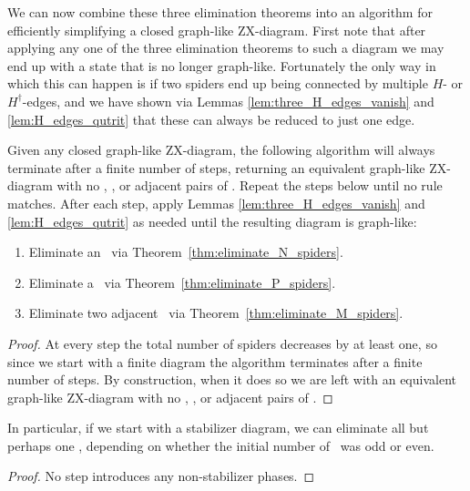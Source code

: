 \documentclass[submission,copyright,creativecommons]{eptcs}
\begin{document}
We can now combine these three elimination theorems into an algorithm for efficiently simplifying a closed graph-like ZX-diagram. First note that after applying any one of the three elimination theorems to such a diagram we may end up with a state that is no longer graph-like. Fortunately the only way in which this can happen is if two spiders end up being connected by multiple $H$- or $H^\dagger$-edges, and we have shown via Lemmas \ref{lem:three_H_edges_vanish} and \ref{lem:H_edges_qutrit} that these can always be reduced to just one edge.

\begin{theorem}\label{thm:simplification_algorithm_works}
	Given any closed graph-like ZX-diagram, the following algorithm will always terminate after a finite number of steps, returning an equivalent graph-like ZX-diagram with no \Nspiders, \Pspiders, or adjacent pairs of \Mspiders. Repeat the steps below until no rule matches. After each step, apply Lemmas \ref{lem:three_H_edges_vanish} and \ref{lem:H_edges_qutrit} as needed until the resulting diagram is graph-like:
	\begin{enumerate}
		\item Eliminate an \Nspider\ via Theorem~\ref{thm:eliminate_N_spiders}.
		\item Eliminate a \Pspider\ via Theorem~\ref{thm:eliminate_P_spiders}.
		\item Eliminate two adjacent \Mspiders\ via Theorem~\ref{thm:eliminate_M_spiders}.
	\end{enumerate}
	\begin{proof}
		At every step the total number of spiders decreases by at least one, so since we start with a finite diagram the algorithm terminates after a finite number of steps. By construction, when it does so we are left with an equivalent graph-like ZX-diagram with no \Nspiders, \Pspiders, or adjacent pairs of \Mspiders.
	\end{proof}
\end{theorem}

\begin{corollary}\label{cor:stabilizer_simplification_algorithm_works}
	In particular, if we start with a stabilizer diagram, we can eliminate all but perhaps one \Mspider, depending on whether the initial number of \Mspiders\ was odd or even. 
	\begin{proof}
		No step introduces any non-stabilizer phases.
	\end{proof}
\end{corollary}
\end{document}
